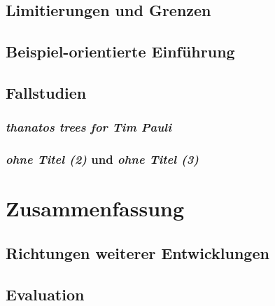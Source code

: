 \documentclass[12pt,a4paper,ngerman]{article}
\begin{document}
\subsection{Limitierungen und Grenzen}



\subsection{Beispiel-orientierte Einführung}


\subsection{Fallstudien}

\subsubsection{\emph{thanatos trees for Tim Pauli}}

\subsubsection{\emph{ohne Titel (2)} und \emph{ohne Titel (3)}}

\section{Zusammenfassung}

\subsection{Richtungen weiterer Entwicklungen}

\subsection{Evaluation}

\newpage

\appendix

\printbibliography

\newpage

\listoffigures

\newpage
\end{document}
